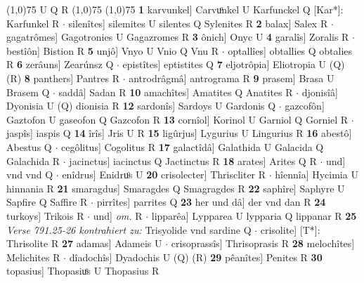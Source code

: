 \documentclass[8pt,a4paper,notitlepage]{article}
\begin{document}
\begin{table}[ht]
\begin{minipage}[t]{0.5\linewidth}
\scriptsize
\line(1,0){75} \newline
U Q R \newline
\line(1,0){75} \newline
\newline
\line(1,0){75} \newline
\textbf{1} karvunkel] Carvuͦnkel U Karfunckel Q [Kar*]: Karfunkel R  $\cdot$ silenîtes] silemites U silentes Q Sylenites R \textbf{2} balax] Salex R  $\cdot$ gagatrômes] Gagotronies U Gagazromes R \textbf{3} ônich] Onyc U \textbf{4} garalîs] Zoralis R  $\cdot$ bestîôn] Bistion R \textbf{5} unjô] Vnyo U Vnio Q Vnu R  $\cdot$ optallîes] obtallies Q obtalies R \textbf{6} zerâuns] Zearúnsz Q  $\cdot$ epistîtes] eptistites Q \textbf{7} eljotrôpia] Eliotropia U (Q) (R) \textbf{8} panthers] Pantres R  $\cdot$ antrodrâgmâ] antrograma R \textbf{9} prasem] Brasa U Brasem Q  $\cdot$ saddâ] Sadan R \textbf{10} amachîtes] Amatites Q Anatites R  $\cdot$ djonisîâ] Dyonisia U (Q) dionisia R \textbf{12} sardonîs] Sardoys U Gardonis Q  $\cdot$ gazcofôn] Gaztofon U gaseofon Q Gazcofon R \textbf{13} cornîol] Korinol U Garniol Q Gorniel R  $\cdot$ jaspîs] iaspis Q \textbf{14} îrîs] Jris U R \textbf{15} ligûrjus] Lygurius U Lingurius R \textbf{16} abestô] Abestus Q  $\cdot$ cegôlitus] Cogolitus R \textbf{17} galactîdâ] Galathida U Galacida Q Galachida R  $\cdot$ jacinctus] iacinctus Q Jactinctus R \textbf{18} arates] Arites Q R  $\cdot$ und] vnd vnd Q  $\cdot$ enîdrus] Enidruͦs U \textbf{20} crisolecter] Thriscliter R  $\cdot$ hîennîa] Hycimia U hinnania R \textbf{21} smaragdus] Smaragdes Q Smagragdes R \textbf{22} saphîre] Saphyre U Sapfire Q Saffire R  $\cdot$ pirrîtes] parrites Q \textbf{23} her und dâ] der vnd dan R \textbf{24} turkoys] Trikois R  $\cdot$ und] \textit{om.} R  $\cdot$ lipparêa] Lypparea U lypparia Q lippanar R \textbf{25} \textit{Verse 791.25-26 kontrahiert zu:} Trisyolide vnd sardine Q   $\cdot$ crisolite] [T*]: Thrisolite R \textbf{27} adamas] Adameis U  $\cdot$ crisoprassîs] Thrisoprasis R \textbf{28} melochîtes] Melichites R  $\cdot$ dîadochîs] Dyadochis U (Q) (R) \textbf{29} pêanîtes] Penites R \textbf{30} topasius] Thopasiuͦs U Thopasius R \newline
\end{minipage}
\end{table}
\end{document}
